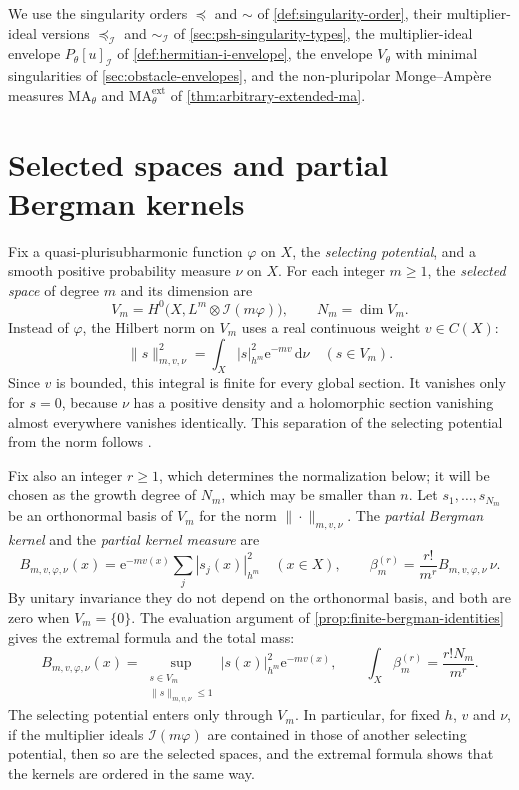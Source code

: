 We use the singularity orders $\preceq$ and $\sim$ of \cref{def:singularity-order}, their multiplier-ideal versions $\preceq_{\mathcal I}$ and $\sim_{\mathcal I}$ of \cref{sec:psh-singularity-types}, the multiplier-ideal envelope $P_\theta[u]_{\mathcal I}$ of \cref{def:hermitian-i-envelope}, the envelope $V_\theta$ with minimal singularities of \cref{sec:obstacle-envelopes}, and the non-pluripolar Monge--Amp\`ere measures $\mathrm{MA}_\theta$ and $\mathrm{MA}^{\mathrm{ext}}_\theta$ of \cref{thm:arbitrary-extended-ma}.

\section{Selected spaces and partial Bergman kernels}\label{sec:partial-selected-space}

Fix a quasi-plurisubharmonic function $\varphi$ on $X$, the \emph{selecting potential}, and a smooth positive probability measure $\nu$ on $X$. For each integer $m\geq1$, the \emph{selected space} of degree $m$ and its dimension are
\[
 V_m=H^0\bigl(X,L^m\otimes\mathcal I(m\varphi)\bigr),
 \qquad N_m=\dim V_m.
\]
Instead of $\varphi$, the Hilbert norm on $V_m$ uses a real continuous weight $v\in C(X)$:
\[
 \|s\|_{m,v,\nu}^2=\int_X|s|_{h^m}^2\mathrm{e}^{-mv}\,\mathrm{d}\nu
 \quad(s\in V_m).
\]
Since $v$ is bounded, this integral is finite for every global section. It vanishes only for $s=0$, because $\nu$ has a positive density and a holomorphic section vanishing almost everywhere vanishes identically. This separation of the selecting potential from the norm follows \cite[Section~14.3]{SGPT}.

Fix also an integer $r\geq1$, which determines the normalization below; it will be chosen as the growth degree of $N_m$, which may be smaller than $n$. Let $s_1,\ldots,s_{N_m}$ be an orthonormal basis of $V_m$ for the norm $\|\cdot\|_{m,v,\nu}$. The \emph{partial Bergman kernel} and the \emph{partial kernel measure} are
\[
 B_{m,v,\varphi,\nu}(x)
       =\mathrm{e}^{-mv(x)}\sum_j|s_j(x)|_{h^m}^2
 \quad(x\in X),
 \qquad
 \beta_m^{(r)}=\frac{r!}{m^r}B_{m,v,\varphi,\nu}\,\nu.
\]
By unitary invariance they do not depend on the orthonormal basis, and both are zero when $V_m=\{0\}$. The evaluation argument of \cref{prop:finite-bergman-identities} gives the extremal formula and the total mass:
\[
 B_{m,v,\varphi,\nu}(x)
 =\sup_{\substack{s\in V_m\\\|s\|_{m,v,\nu}\leq1}}
       |s(x)|_{h^m}^2\mathrm{e}^{-mv(x)},
 \qquad
 \int_X\beta_m^{(r)}=\frac{r!N_m}{m^r}.
\]
The selecting potential enters only through $V_m$. In particular, for fixed $h$, $v$ and $\nu$, if the multiplier ideals $\mathcal I(m\varphi)$ are contained in those of another selecting potential, then so are the selected spaces, and the extremal formula shows that the kernels are ordered in the same way.

